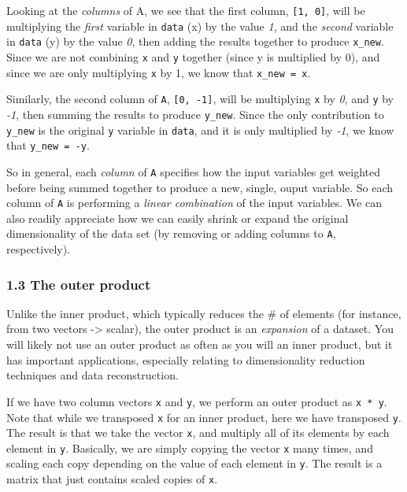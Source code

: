 \documentclass[11pt]{article}
\begin{document}
Looking at the \emph{columns} of A, we see that the first column,
\texttt{{[}1,\ 0{]}}, will be multiplying the \emph{first} variable in
\texttt{data} (x) by the value \emph{1}, and the \emph{second} variable
in \texttt{data} (y) by the value \emph{0}, then adding the results
together to produce \texttt{x\_new}. Since we are not combining
\texttt{x} and \texttt{y} together (since y is multiplied by 0), and
since we are only multiplying \texttt{x} by 1, we know that
\texttt{x\_new\ =\ x}.

Similarly, the second column of \texttt{A}, \texttt{{[}0,\ -1{]}}, will
be multiplying \texttt{x} by \emph{0}, and \texttt{y} by \emph{-1}, then
summing the results to produce \texttt{y\_new}. Since the only
contribution to \texttt{y\_new} is the original \texttt{y} variable in
\texttt{data}, and it is only multiplied by \emph{-1}, we know that
\texttt{y\_new\ =\ -y}.

So in general, each \emph{column} of \texttt{A} specifies how the input
variables get weighted before being summed together to produce a new,
single, ouput variable. So each column of \texttt{A} is performing a
\emph{linear combination} of the input variables. We can also readily
appreciate how we can easily shrink or expand the original
dimensionality of the data set (by removing or adding columns to
\texttt{A}, respectively).

    \hypertarget{the-outer-product}{%
\subsubsection{1.3 The outer product }\label{the-outer-product}}

Unlike the inner product, which typically reduces the \# of elements
(for instance, from two vectors -\textgreater{} scalar), the outer
product is an \emph{expansion} of a dataset. You will likely not use an
outer product as often as you will an inner product, but it has
important applications, especially relating to dimensionality reduction
techniques and data reconstruction.

If we have two column vectors \texttt{x} and \texttt{y}, we perform an
outer product as \texttt{x\ *\ y\textquotesingle{}}. Note that while we
transposed \texttt{x} for an inner product, here we have transposed
\texttt{y}. The result is that we take the vector \texttt{x}, and
multiply all of its elements by each element in \texttt{y}. Basically,
we are simply copying the vector \texttt{x} many times, and scaling each
copy depending on the value of each element in \texttt{y}. The result is
a matrix that just contains scaled copies of \texttt{x}.
\end{document}
